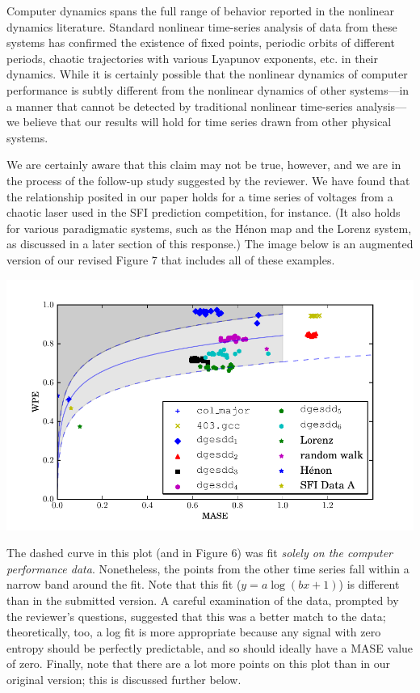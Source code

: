\documentclass[12pt]{article}
\begin{document}
Computer dynamics spans the full range of behavior reported in the
nonlinear dynamics literature.  Standard nonlinear time-series
analysis of data from these systems has confirmed the existence of
fixed points, periodic orbits of different periods, chaotic
trajectories with various Lyapunov exponents, etc.  in their dynamics.
While it is certainly possible that the nonlinear dynamics of computer
performance is subtly different from the nonlinear dynamics of other
systems---in a manner that cannot be detected by traditional nonlinear
time-series analysis---we believe that our results will hold for time
series drawn from other physical systems.

We are certainly aware that this claim may not be true, however, and
we are in the process of the follow-up study suggested by the
reviewer.  We have found that the relationship posited in our paper
holds for a time series of voltages from a chaotic laser used in the
SFI prediction competition, for instance.  (It also holds for various
paradigmatic systems, such as the H\'{e}non map and the Lorenz system, as
discussed in a later section of this response.)  The image below is an
augmented version of our revised Figure 7 that includes all of these
examples.

\begin{center}
    \includegraphics[width=0.8\columnwidth]{figs/new_prediction_vs_entropy_extras}
\end{center}

\noindent The dashed curve in this plot (and in Figure 6) was fit
\emph{solely on the computer performance data}.  Nonetheless, the
points from the other time series fall within a narrow band around the
fit.  Note that this fit ($y = a \log(b x + 1)$) is different than in
the submitted version.  A careful examination of the data, prompted by
the reviewer's questions, suggested that this was a better match to
the data; theoretically, too, a log fit is more appropriate because
any signal with zero entropy should be perfectly predictable, and so
should ideally have a MASE value of zero.  Finally, note that there
are a lot more points on this plot than in our original version; this
is discussed further below.
\end{document}
